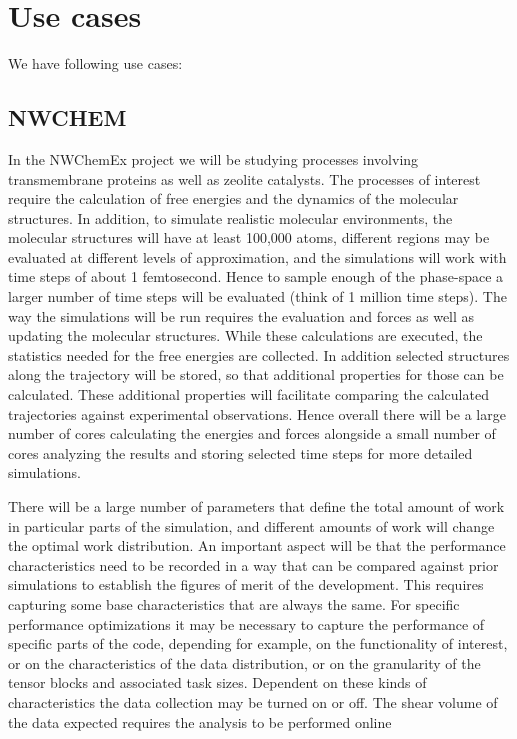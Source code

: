 \section{Use cases}
We have following use cases:

\subsection{NWCHEM}
In the NWChemEx project we will be studying processes involving transmembrane proteins as well as zeolite catalysts. The processes of interest require the calculation of free energies and the dynamics of the molecular structures. In addition, to simulate realistic molecular environments, the molecular structures will have at least 100,000 atoms, different regions may be evaluated at different levels of approximation, and the simulations will work with time steps of about 1 femtosecond.  Hence to sample enough of the phase-space a larger number of time steps will be evaluated (think of 1 million time steps). The way the simulations will be run requires the evaluation and forces as well as updating the molecular structures. While these calculations are executed, the statistics needed for the free energies are collected. In addition selected structures along the trajectory will be stored, so that additional properties for those can be calculated. These additional properties will facilitate comparing the calculated trajectories against experimental observations.  Hence overall there will be a large number of cores calculating the energies and forces alongside a small number of cores analyzing the results and storing selected time steps for more detailed simulations. 

There will be a large number of parameters that define the total amount of work in particular parts of the simulation, and different amounts of work will change the optimal work distribution. An important aspect will be that the performance characteristics need to be recorded in a way that can be compared against prior simulations to establish the figures of merit of the development. This requires capturing some base characteristics that are always the same. 
For specific performance optimizations it may be necessary to capture the performance of specific parts of the code, depending for example, on the functionality of interest, or on the characteristics of the data distribution, or on the granularity of the tensor blocks and associated task sizes. Dependent on these kinds of characteristics the data collection may be turned on or off. The shear volume of the data expected requires the analysis to be performed online

